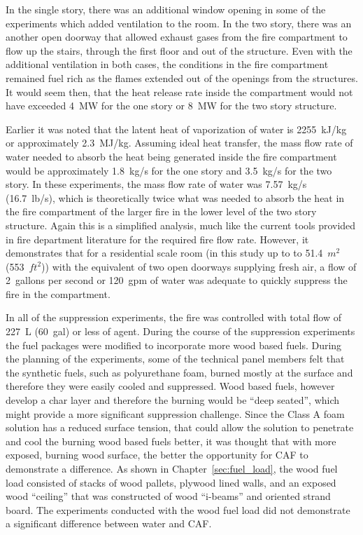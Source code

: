 \documentclass[12pt,oneside]{book}
\begin{document}
In the single story, there was an additional window opening in some of the experiments which added ventilation to the room. In the two story, there was an another open doorway that allowed exhaust gases from the fire compartment to flow up the stairs, through the first floor and out of the structure. Even with the additional ventilation in both cases, the conditions in the fire compartment remained fuel rich as the flames extended out of the openings from the structures. It would seem then, that the heat release rate inside the compartment would not have exceeded 4~MW for the one story or 8~MW for the two story structure. 

Earlier it was noted that the latent heat of vaporization of water is 2255~kJ/kg or approximately 2.3~MJ/kg. Assuming ideal heat transfer, the mass flow rate of water needed to absorb the heat being generated inside the fire compartment would be approximately 1.8~kg/s for the one story and 3.5~kg/s for the two story. In these experiments, the mass flow rate of water was 7.57~kg/s (16.7~lb/s), which is theoretically twice what was needed to absorb the heat in the fire compartment of the larger fire in the lower level of the two story structure. Again this is a simplified analysis, much like the current tools provided in fire department literature for the required fire flow rate. However, it demonstrates that for a residential scale room (in this study up to to 51.4~$m^2$ (553~$ft^2$)) with the equivalent of two open doorways supplying fresh air, a flow of 2~gallons per second or 120~gpm of water was adequate to quickly suppress the fire in the compartment.                

In all of the suppression experiments, the fire was controlled with total flow of 227~L (60~gal) or less of agent. During the course of the suppression experiments the fuel packages were modified to incorporate more wood based fuels. During the planning of the experiments, some of the technical panel members felt that the synthetic fuels, such as polyurethane foam, burned mostly at the surface and therefore they were easily cooled and suppressed. Wood based fuels, however develop a char layer and therefore the burning would be ``deep seated'', which might provide a more significant suppression challenge. Since the Class A foam solution has a reduced surface tension, that could allow the solution to penetrate and cool the burning wood based fuels better, it was thought that with more exposed, burning wood surface, the better the opportunity for CAF to demonstrate a difference. As shown in Chapter~\ref{sec:fuel_load}, the wood fuel load consisted of stacks of wood pallets, plywood lined walls, and an exposed wood ``ceiling'' that was constructed of wood ``i-beams'' and oriented strand board. The experiments conducted with the wood fuel load did not demonstrate a significant difference between water and CAF.  
\end{document}
